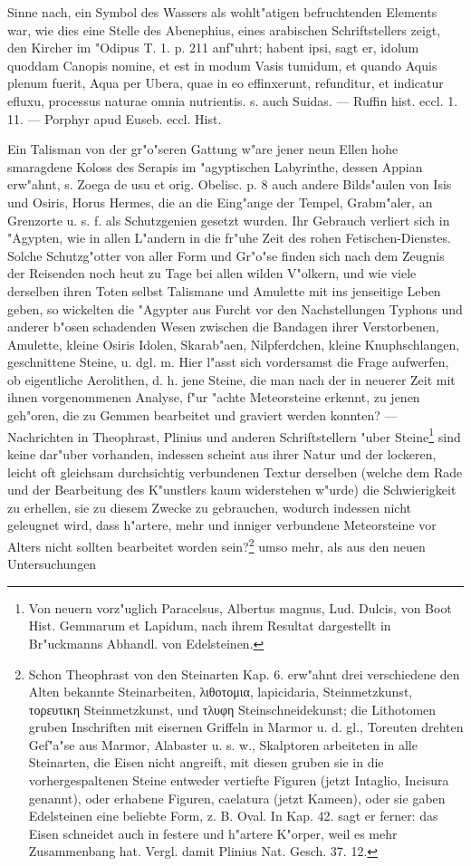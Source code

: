\documentclass[a4paper, 11pt, oneside, polutonikogreek, german]{article}
\begin{document}
Sinne nach, ein Symbol des Wassers als wohlt"atigen befruchtenden Elements war, wie dies eine Stelle des Abenephius, eines arabischen Schriftstellers zeigt, den Kircher im "Odipus T. 1. p. 211 anf"uhrt; habent ipsi, sagt er, idolum quoddam Canopis nomine, et est in modum Vasis tumidum, et quando Aquis plenum fuerit, Aqua per Ubera, quae in eo effinxerunt, refunditur, et indicatur efluxu, processus naturae omnia nutrientis. s. auch Suidas. --- Ruffin hist. eccl. 1. 11. --- Porphyr apud Euseb. eccl. Hist.

Ein Talisman von der gr"o"seren Gattung w"are jener neun Ellen hohe smaragdene Koloss des Serapis im "agyptischen Labyrinthe, dessen Appian erw"ahnt, s. Zoega de usu et orig. Obelisc. p. 8 auch andere Bilds"aulen von Isis und Osiris, Horus Hermes, die an die Eing"ange der Tempel, Grabm"aler, an Grenzorte u. s. f. als Schutzgenien gesetzt wurden. Ihr Gebrauch verliert sich in "Agypten, wie in allen L"andern in die fr"uhe Zeit des rohen Fetischen-Dienstes. Solche Schutzg"otter von aller Form und Gr"o"se finden sich nach dem Zeugnis der Reisenden noch heut zu Tage bei allen wilden V"olkern, und wie viele derselben ihren Toten selbst Talismane und Amulette mit ins jenseitige Leben geben, so wickelten die "Agypter aus Furcht vor den Nachstellungen Typhons und anderer b"osen schadenden Wesen zwischen die Bandagen ihrer Verstorbenen, Amulette, kleine Osiris Idolen, Skarab"aen, Nilpferdchen, kleine Knuphschlangen, geschnittene Steine, u. dgl. m. Hier l"asst sich vordersamst die Frage aufwerfen, ob eigentliche Aerolithen, d. h. jene Steine, die man nach der in neuerer Zeit mit ihnen vorgenommenen Analyse, f"ur "achte Meteorsteine erkennt, zu jenen geh"oren, die zu Gemmen bearbeitet und graviert werden konnten? --- Nachrichten in Theophrast, Plinius und anderen Schriftstellern "uber Steine\footnote{Von neuern vorz"uglich Paracelsus, Albertus magnus, Lud. Dulcis, von Boot Hist. Gemmarum et Lapidum, nach ihrem Resultat dargestellt in Br"uckmanns Abhandl. von Edelsteinen.} sind keine dar"uber vorhanden, indessen scheint aus ihrer Natur und der lockeren, leicht oft gleichsam durchsichtig verbundenen Textur derselben (welche dem Rade und der Bearbeitung des K"unstlers kaum widerstehen w"urde) die Schwierigkeit zu erhellen, sie zu diesem Zwecke zu gebrauchen, wodurch indessen nicht geleugnet wird, dass h"artere, mehr und inniger verbundene Meteorsteine vor Alters nicht sollten bearbeitet worden sein?\footnote{Schon Theophrast von den Steinarten Kap. 6. erw"ahnt drei verschiedene den Alten bekannte Steinarbeiten, λιθοτομια, lapicidaria, Steinmetzkunst, τορευτικη Steinmetzkunst, und τλυφη Steinschneidekunst; die Lithotomen gruben Inschriften mit eisernen Griffeln in Marmor u. d. gl., Toreuten drehten Gef"a"se aus Marmor, Alabaster u. s. w., Skalptoren arbeiteten in alle Steinarten, die Eisen nicht angreift, mit diesen gruben sie in die vorhergespaltenen Steine entweder vertiefte Figuren (jetzt Intaglio, Incisura genannt), oder erhabene Figuren, caelatura (jetzt Kameen), oder sie gaben Edelsteinen eine beliebte Form, z. B. Oval. In Kap. 42. sagt er ferner: das Eisen schneidet auch in festere und h"artere K"orper, weil es mehr Zusammenbang hat. Vergl. damit Plinius Nat. Gesch. 37. 12.} umso mehr, als aus den neuen Untersuchungen 
\end{document}
